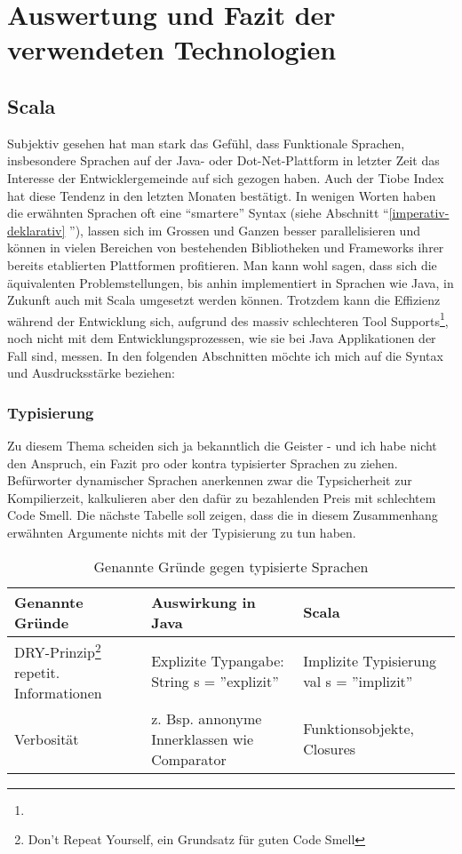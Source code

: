 \chapter{Auswertung und Fazit der verwendeten Technologien}
\section{Scala}\label{auswertung:scala}
Subjektiv gesehen hat man stark das Gef\"uhl, dass Funktionale Sprachen, insbesondere Sprachen auf der Java- oder Dot-Net-Plattform in letzter Zeit das Interesse der Entwicklergemeinde auf sich gezogen haben. Auch der Tiobe Index \cite{tiobe} hat diese Tendenz in den letzten Monaten best\"atigt. In wenigen Worten haben die erw\"ahnten Sprachen oft eine ``smartere'' Syntax (siehe Abschnitt ``\ref{imperativ-deklarativ} ''), lassen sich im Grossen und Ganzen besser parallelisieren und k\"onnen in vielen Bereichen von bestehenden Bibliotheken und Frameworks ihrer bereits etablierten Plattformen profitieren. Man kann wohl sagen, dass sich die \"aquivalenten Problemstellungen, bis anhin implementiert in Sprachen wie Java, in Zukunft auch mit Scala umgesetzt werden k\"onnen. Trotzdem kann die Effizienz w\"ahrend der Entwicklung sich, aufgrund des massiv schlechteren Tool Supports\footnote{}, noch nicht mit dem Entwicklungsprozessen, wie sie bei Java Applikationen der Fall sind, messen. In den folgenden Abschnitten m\"ochte ich mich auf die Syntax und Ausdrucksst\"arke beziehen:
\subsection{Typisierung}
Zu diesem Thema scheiden sich ja bekanntlich die Geister - und ich habe nicht den Anspruch, ein Fazit pro oder kontra typisierter Sprachen zu ziehen. Bef\"urworter dynamischer Sprachen anerkennen zwar die Typsicherheit zur Kompilierzeit, kalkulieren aber den daf\"ur zu bezahlenden Preis mit schlechtem Code Smell.  Die n\"achste Tabelle soll zeigen, dass die in diesem Zusammenhang erw\"ahnten Argumente nichts mit der Typisierung zu tun haben. 
  \begin{longtable}{|p{4cm}|p{4cm}|p{4cm}|}
      \caption{Genannte Gr\"unde gegen typisierte Sprachen}\\
\hline
  \textbf{Genannte Gr\"unde} & \textbf{Auswirkung in Java} & \textbf{Scala}\\
  \hline
  DRY-Prinzip\footnote{Don't Repeat Yourself, ein Grundsatz f\"ur guten Code Smell} \newline repetit. Informationen& 
  Explizite Typangabe: \newline String s = ''explizit'' & Implizite Typisierung \newline val s = ''implizit''\\
  \hline
  Verbosit\"at & z. Bsp. annonyme Innerklassen wie Comparator & Funktionsobjekte, Closures \\
  \hline
\end{longtable}

